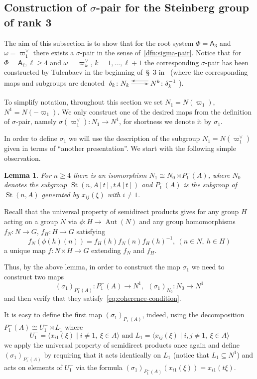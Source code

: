 \documentclass[oneside, 10pt]{amsart}
\DeclareMathOperator{\St}{St}
\DeclareMathOperator{\Aut}{Aut}
\newcommand{\rA}{\mathsf{A}}
\numberwithin{equation}{section}
\newtheorem{lemma}{Lemma}
\numberwithin{lemma}{section}
\theoremstyle{definition}
\theoremstyle{remark}
\begin{document}
\subsection{Construction of \texorpdfstring{$\sigma$}{sigma}-pair for the Steinberg group of rank 3}
The aim of this subsection is to show that for the root system $\Phi=\rA_3$ and $\omega = \varpi_1^\vee$
 there exists a $\sigma$-pair in the sense of~\cref{dfn:sigma-pair}.
Notice that for $\Phi = \rA_\ell, \ell \geq 4$ and $\omega=\varpi_k^\vee$, $k=1,\ldots,\ell+1$ 
the corresponding $\sigma$-pair has been constructed by Tulenbaev in the beginning of~\S~3 in~\cite{Tu83} 
 (where the corresponding maps and subgroups are denoted $\xymatrix{\delta_k \ar[r] \colon N_k & \ar@<-1.0ex>[l] N^k \colon \delta_k^{-1}}$).

To simplify notation, throughout this section we set $N_1 = N(\varpi_1)$, $N^1 = N(-\varpi_1)$.
We only construct one of the desired maps from the definition of $\sigma$-pair, namely $\sigma(\varpi_1^\vee) \colon N_1 \to N^1$,
 for shortness we denote it by $\sigma_1$.
 
In order to define $\sigma_1$ we will use the description of the subgroup $N_1 = N(\varpi_1^\vee)$ given in terms of ``another presentation''.
We start with the following simple observation.
\begin{lemma} \label{lem:n1-decomp} For $n\geq 4$ there is an isomorphism $N_1 \cong N_{0} \rtimes P_1^-(A)$, 
 where $N_{0}$ denotes the subgroup $\St(n, A[t], tA[t])$ and $P_1^-(A)$ is the subgroup of $\St(n, A)$ generated by $x_{ij}(\xi)$ with $i\neq 1$.
\end{lemma}

Recall that the universal property of semidirect products gives for any group $H$ acting on a group $N$ via $\phi \colon H \to \Aut(N)$ 
and any group homomorphisms $f_N\colon N \to G$, $f_H\colon H \to G$ satisfying 
\begin{equation} \label{eq:coherence-condition} f_N(\phi(h)(n)) = f_H(h) f_N(n) f_H(h)^{-1},\ (n\in N,\ h\in H) \end{equation} 
a unique map $f\colon N \rtimes H \to G$ extending $f_N$ and $f_H$.

Thus, by the above lemma, in order to construct the map $\sigma_1$ we need to construct two maps 
\[ (\sigma_1)_{P_1^-(A)} \colon P_1^-(A) \to N^1, \ \ (\sigma_1)_{N_{0}} \colon N_{0} \to N^1\]
and then verify that they satisfy~\eqref{eq:coherence-condition}.

It is easy to define the first map $(\sigma_1)_{P_1^-(A)}$, indeed, using the decomposition $P_1^-(A) \cong U^-_1 \rtimes L_1$ where 
\[U^-_1 = \langle x_{i1}(\xi) \mid i\neq 1,\ \xi\in A \rangle \text{ and } L_1 = \langle x_{ij}(\xi) \mid i,  j \neq 1,\ \xi\in A\rangle \]
we apply the universal property of semidirect products once again 
and define $(\sigma_1)_{P_1^-(A)}$ by requiring that it acts identically on $L_1$ (notice that $L_1 \subseteq N^1$) %
and acts on elements of $U^-_1$ via the formula $(\sigma_1)_{P_1^-(A)}(x_{i1}(\xi))= x_{i1}(t\xi)$.
\end{document}
